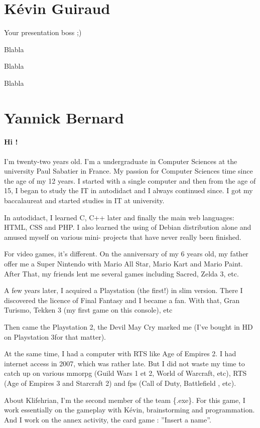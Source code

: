 \documentclass[a4paper,12pt]{book}
\begin{document}
\section*{K\'{e}vin Guiraud}
Your presentation boss ;)

Blabla

Blabla

Blabla
\section*{Yannick Bernard}
\paragraph{Hi !} I'm twenty-two years old. I'm a undergraduate in Computer Sciences at the university Paul Sabatier in France. My passion for Computer Sciences time since the age of my 12 years. I started with a single computer and then from the age of 15, I began to study the IT in autodidact and I always continued since. I got my baccalaureat and started studies in IT at university.

In autodidact, I learned C, C++ later and finally the main web languages: HTML, CSS and PHP. I also learned the using of Debian distribution alone and amused myself on various mini- projects that have never really been finished.

For video games, it's different. On the anniversary of my 6 years old, my father offer me a Super Nintendo with Mario All Star, Mario Kart and Mario Paint. After That, my friends lent me several games including Sacred, Zelda 3, etc.

A few years later, I acquired a Playstation (the first!) in slim version. There I discovered the licence of Final Fantasy and I became a fan. With that, Gran Turismo, Tekken 3 (my first game on this console), etc

Then came the Playstation 2, the Devil May Cry marked me (I've bought in HD on Playstation 3for that matter).

At the same time, I had a computer with RTS like Age of Empires 2. I had internet access in 2007, which was rather late. But I did not waste my time to catch up on various mmorpg (Guild Wars 1 et 2, World of Warcraft, etc), RTS (Age of Empires 3 and Starcraft 2) and fps (Call of Duty, Battlefield , etc).

About Klifehrian, I'm the second member of the team \{.exe\}. For this game, I work essentially on the gameplay with K\'{e}vin, brainstorming and programmation. And I work on the annex activity, the card game : ''Insert a name''.
\end{document}
